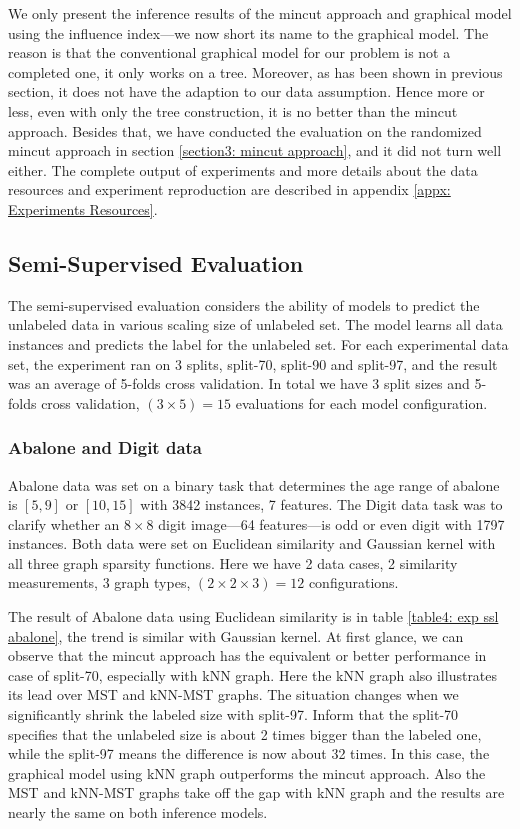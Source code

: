 We only present the inference results of the mincut approach and graphical model using the influence index---we now short its name to the graphical model. The reason is that the conventional graphical model for our problem is not a completed one, it only works on a tree. Moreover, as has been shown in previous section, it does not have the adaption to our data assumption. Hence more or less, even with only the tree construction, it is no better than the mincut approach. Besides that, we have conducted the evaluation on the randomized mincut approach in section \ref{section3: mincut approach}, and it did not turn well either. The complete output of experiments and more details about the data resources and experiment reproduction are described in appendix \ref{appx: Experiments Resources}.

\subsection{Semi-Supervised Evaluation}
\label{subsection: exp ssl}

The semi-supervised evaluation considers the ability of models to predict the unlabeled data in various scaling size of unlabeled set. The model learns all data instances and predicts the label for the unlabeled set. For each experimental data set, the experiment ran on 3 splits, split-70, split-90 and split-97, and the result was an average of 5-folds cross validation. In total we have 3 split sizes and 5-folds cross validation, $(3\times5) = 15$ evaluations for each model configuration.

\subsubsection*{Abalone and Digit data}
Abalone data was set on a binary task that determines the age range of abalone is $[5, 9]$ or $[10, 15]$ with 3842 instances, 7 features. The Digit data task was to clarify whether an $8\times8$ digit image---64 features---is odd or even digit with 1797 instances. Both data were set on Euclidean similarity and Gaussian kernel with all three graph sparsity functions. Here we have 2 data cases, 2 similarity measurements, 3 graph types, $(2 \times 2 \times 3) = 12$ configurations. 

The result of Abalone data using Euclidean similarity is in table \ref{table4: exp ssl abalone}, the trend is similar with Gaussian kernel. At first glance, we can observe that the mincut approach has the equivalent or better performance in case of split-70, especially with kNN graph. Here the kNN graph also illustrates its lead over MST and kNN-MST graphs. The situation changes when we significantly shrink the labeled size with split-97. Inform that the split-70 specifies that the unlabeled size is about 2 times bigger than the labeled one, while the split-97 means the difference is now about 32 times. In this case, the graphical model using kNN graph outperforms the mincut approach. Also the MST and kNN-MST graphs take off the gap with kNN graph and the results are nearly the same on both inference models.

